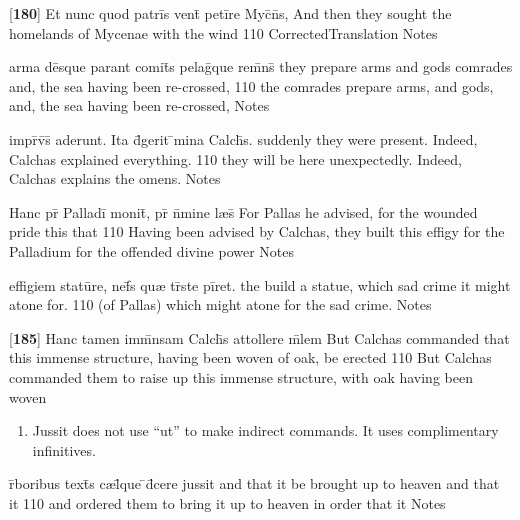\latline
  {[\textbf{180}] Et nunc quod patri\={}s vent\={} peti\={}re Myc\={}n\={}s,}
  { And then they sought the homelands of Mycenae with the wind }
  {110}
  { CorrectedTranslation }
  { Notes }


\latline
  {arma de\={}sque parant comit\={}s pelag\={}que rem\={}ns\={}}
  { they prepare arms and gods comrades and, the sea having been re-crossed,  }     
  {110}
  { the comrades prepare arms, and gods, and, the sea having been re-crossed,  }
  { Notes }


\latline
  {impr\={}v\={\macron {\i}}s\={\macron {\i}} aderunt.  Ita d\={\macron {\i}}gerit \={}mina Calch\={}s.}
  { suddenly they were present.  Indeed, Calchas explained everything. }              
  {110}
  { they will be here unexpectedly.  Indeed, Calchas explains the omens. }
  { Notes }


\latline
  {Hanc pr\={} Palladi\={} monit\={\macron {\i}}, pr\={} n\={}mine l{\ae}s\={}}
  { For Pallas he advised, for the wounded pride this that  }
  {110}
  { Having been advised by Calchas, they built this effigy for the Palladium for the offended divine power  }
  { Notes }


\latline
  {effigiem statu\={}re, nef\={}s qu{\ae} tr\={\macron {\i}}ste pi\={}ret.}
  { the build a statue, which sad crime it might atone for. }  
  {110}
  { (of Pallas) which might atone for the sad crime. }
  { Notes }


\latline
  {[\textbf{185}] Hanc tamen imm\={}nsam Calch\={}s attollere m\={}lem}
  { But Calchas commanded that this immense structure, having been woven of oak, be erected }  
  {110}
  { But Calchas commanded them to raise up this immense structure, with oak having been woven } 
  { \begin{enumerate}
  	\item Jussit does not use ``ut'' to make indirect commands.  It uses complimentary infinitives.
  \end{enumerate} }


\latline
  {r\={}boribus text\={\macron {\i}}s c{\ae}l\={}que \={}d\={}cere jussit}
  { and that it be brought up to heaven and that it }     
  {110}
  { and ordered them to bring it up to heaven in order that it }
  { Notes }


